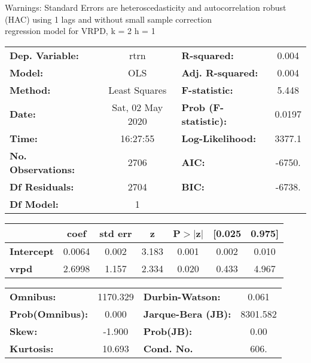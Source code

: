 Warnings: \newline
 [1] Standard Errors are heteroscedasticity and autocorrelation robust (HAC) using 1 lags and without small sample correction\\ 

regression model for VRPD, k = 2 h = 1\begin{center}
\begin{tabular}{lclc}
\toprule
\textbf{Dep. Variable:}    &       rtrn       & \textbf{  R-squared:         } &     0.004   \\
\textbf{Model:}            &       OLS        & \textbf{  Adj. R-squared:    } &     0.004   \\
\textbf{Method:}           &  Least Squares   & \textbf{  F-statistic:       } &     5.448   \\
\textbf{Date:}             & Sat, 02 May 2020 & \textbf{  Prob (F-statistic):} &   0.0197    \\
\textbf{Time:}             &     16:27:55     & \textbf{  Log-Likelihood:    } &    3377.1   \\
\textbf{No. Observations:} &        2706      & \textbf{  AIC:               } &    -6750.   \\
\textbf{Df Residuals:}     &        2704      & \textbf{  BIC:               } &    -6738.   \\
\textbf{Df Model:}         &           1      & \textbf{                     } &             \\
\bottomrule
\end{tabular}
\begin{tabular}{lcccccc}
                   & \textbf{coef} & \textbf{std err} & \textbf{z} & \textbf{P$> |$z$|$} & \textbf{[0.025} & \textbf{0.975]}  \\
\midrule
\textbf{Intercept} &       0.0064  &        0.002     &     3.183  &         0.001        &        0.002    &        0.010     \\
\textbf{vrpd}      &       2.6998  &        1.157     &     2.334  &         0.020        &        0.433    &        4.967     \\
\bottomrule
\end{tabular}
\begin{tabular}{lclc}
\textbf{Omnibus:}       & 1170.329 & \textbf{  Durbin-Watson:     } &    0.061  \\
\textbf{Prob(Omnibus):} &   0.000  & \textbf{  Jarque-Bera (JB):  } & 8301.582  \\
\textbf{Skew:}          &  -1.900  & \textbf{  Prob(JB):          } &     0.00  \\
\textbf{Kurtosis:}      &  10.693  & \textbf{  Cond. No.          } &     606.  \\
\bottomrule
\end{tabular}
\end{center}

